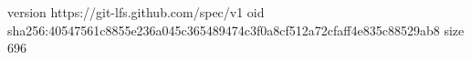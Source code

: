 version https://git-lfs.github.com/spec/v1
oid sha256:40547561c8855e236a045c365489474c3f0a8cf512a72cfaff4e835c88529ab8
size 696

